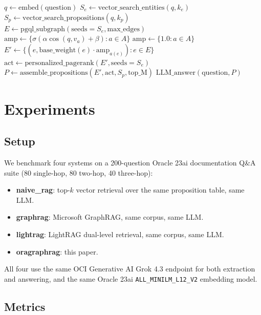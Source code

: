 \documentclass{article}
\begin{document}
\begin{algorithm}
\caption{OraGraphRAG query-time pipeline}
\label{alg:query}
\begin{algorithmic}[1]
\State $q \gets \mathrm{embed}(\mathrm{question})$
\State $S_e \gets \mathrm{vector\_search\_entities}(q, k_e)$
\State $S_p \gets \mathrm{vector\_search\_propositions}(q, k_p)$
\State $E \gets \mathrm{pgql\_subgraph}(\mathrm{seeds}=S_e, \mathrm{max\_edges})$
\State $\mathrm{amp} \gets \{\sigma(\alpha \cos(q, v_a) + \beta) : a \in A\}$
  \State $\mathrm{amp} \gets \{1.0 : a \in A\}$ 
\EndIf
\State $E' \gets \{(e, \mathrm{base\_weight}(e) \cdot \mathrm{amp}_{a(e)}) : e \in E\}$
\State $\mathrm{act} \gets \mathrm{personalized\_pagerank}(E', \mathrm{seeds}=S_e)$
\State $P \gets \mathrm{assemble\_propositions}(E', \mathrm{act}, S_p, \mathrm{top\_M})$
\State \Return $\mathrm{LLM\_answer}(\mathrm{question}, P)$
\end{algorithmic}
\end{algorithm}

\section{Experiments}
\label{sec:experiments}

\subsection{Setup}

We benchmark four systems on a 200-question Oracle 23ai documentation Q\&A
suite (80 single-hop, 80 two-hop, 40 three-hop):

\begin{itemize}
  \item \textbf{naive\_rag}: top-$k$ vector retrieval over the same
        proposition table, same LLM.
  \item \textbf{graphrag}: Microsoft GraphRAG, same corpus, same LLM.
  \item \textbf{lightrag}: LightRAG dual-level retrieval, same corpus, same LLM.
  \item \textbf{oragraphrag}: this paper.
\end{itemize}

All four use the same OCI Generative AI Grok 4.3 endpoint for both
extraction and answering, and the same Oracle 23ai \texttt{ALL\_MINILM\_L12\_V2}
embedding model.

\subsection{Metrics}
\end{document}
